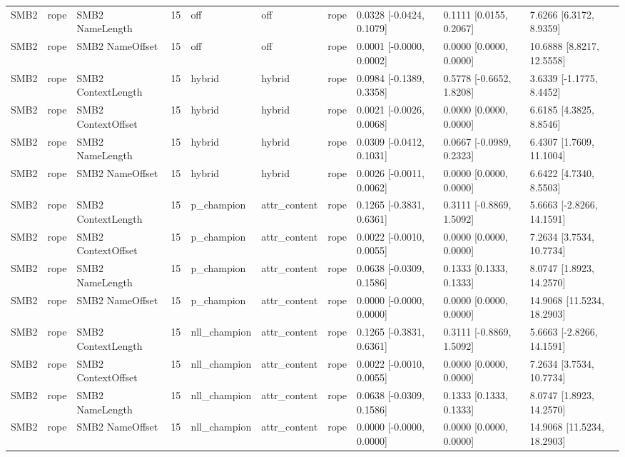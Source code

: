 \begin{tabular}{llllllllll}
SMB2 & rope & SMB2 NameLength & 15 & off & off & rope & 0.0328 [-0.0424, 0.1079] & 0.1111 [0.0155, 0.2067] & 7.6266 [6.3172, 8.9359] \\
SMB2 & rope & SMB2 NameOffset & 15 & off & off & rope & 0.0001 [-0.0000, 0.0002] & 0.0000 [0.0000, 0.0000] & 10.6888 [8.8217, 12.5558] \\
SMB2 & rope & SMB2 ContextLength & 15 & hybrid & hybrid & rope & 0.0984 [-0.1389, 0.3358] & 0.5778 [-0.6652, 1.8208] & 3.6339 [-1.1775, 8.4452] \\
SMB2 & rope & SMB2 ContextOffset & 15 & hybrid & hybrid & rope & 0.0021 [-0.0026, 0.0068] & 0.0000 [0.0000, 0.0000] & 6.6185 [4.3825, 8.8546] \\
SMB2 & rope & SMB2 NameLength & 15 & hybrid & hybrid & rope & 0.0309 [-0.0412, 0.1031] & 0.0667 [-0.0989, 0.2323] & 6.4307 [1.7609, 11.1004] \\
SMB2 & rope & SMB2 NameOffset & 15 & hybrid & hybrid & rope & 0.0026 [-0.0011, 0.0062] & 0.0000 [0.0000, 0.0000] & 6.6422 [4.7340, 8.5503] \\
SMB2 & rope & SMB2 ContextLength & 15 & p\_champion & attr\_content & rope & 0.1265 [-0.3831, 0.6361] & 0.3111 [-0.8869, 1.5092] & 5.6663 [-2.8266, 14.1591] \\
SMB2 & rope & SMB2 ContextOffset & 15 & p\_champion & attr\_content & rope & 0.0022 [-0.0010, 0.0055] & 0.0000 [0.0000, 0.0000] & 7.2634 [3.7534, 10.7734] \\
SMB2 & rope & SMB2 NameLength & 15 & p\_champion & attr\_content & rope & 0.0638 [-0.0309, 0.1586] & 0.1333 [0.1333, 0.1333] & 8.0747 [1.8923, 14.2570] \\
SMB2 & rope & SMB2 NameOffset & 15 & p\_champion & attr\_content & rope & 0.0000 [-0.0000, 0.0000] & 0.0000 [0.0000, 0.0000] & 14.9068 [11.5234, 18.2903] \\
SMB2 & rope & SMB2 ContextLength & 15 & nll\_champion & attr\_content & rope & 0.1265 [-0.3831, 0.6361] & 0.3111 [-0.8869, 1.5092] & 5.6663 [-2.8266, 14.1591] \\
SMB2 & rope & SMB2 ContextOffset & 15 & nll\_champion & attr\_content & rope & 0.0022 [-0.0010, 0.0055] & 0.0000 [0.0000, 0.0000] & 7.2634 [3.7534, 10.7734] \\
SMB2 & rope & SMB2 NameLength & 15 & nll\_champion & attr\_content & rope & 0.0638 [-0.0309, 0.1586] & 0.1333 [0.1333, 0.1333] & 8.0747 [1.8923, 14.2570] \\
SMB2 & rope & SMB2 NameOffset & 15 & nll\_champion & attr\_content & rope & 0.0000 [-0.0000, 0.0000] & 0.0000 [0.0000, 0.0000] & 14.9068 [11.5234, 18.2903] \\

\end{tabular}
